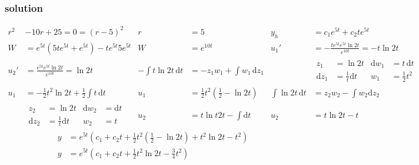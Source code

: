 \documentclass{article}
\begin{document}
\subsubsection*{solution}
\begin{align*}
	r^2&-10r+25=0=(r-5)^2 & r&=5 & y_h&=c_1e^{5t}+c_2te^{5t}\\
	W&=e^{5t}\left(5te^{5t}+e^{5t}\right)-te^{5t}5e^{5t} & W&=e^{10t} & {u_1}'&=-\frac{te^{5t}e^{5t}\ln 2t}{e^{10t}}=-t\ln 2t\\
	{u_2}'&=\frac{e^{5t}e^{5t}\ln 2t}{e^{10t}}=\ln 2t & -\int{t\ln 2t\,\mathrm{d}t}&=-z_1w_1+\int{w_1\,\mathrm{d}z_1} &&
	\begin{aligned}
		z_1&=\ln 2t & \mathrm{d}w_1&=t\,\mathrm{d}t\\
		\mathrm{d}z_1&=\frac{1}{t}\mathrm{d}t & w_1&=\frac{1}{2}t^2
	\end{aligned}\\
	u_1&=-\frac{1}{2}t^2\ln 2t+\frac{1}{2}\int{t\,\mathrm{d}t} & u_1&=\frac{1}{2}t^2\left(\frac{1}{2}-\ln 2t\right) & \int{\ln 2t\,\mathrm{d}t}&=z_2w_2-\int{w_2\mathrm{d}z_2}\\
	&\begin{aligned}
		z_2&=\ln 2t & \mathrm{d}w_2&=\mathrm{d}t\\
		\mathrm{d}z_2&=\frac{1}{t}\mathrm{d}t & w_2&=t
	\end{aligned} &
	u_2&=t\ln t 2t-\int{\mathrm{d}t} & u_2&=t\ln 2t-t
\end{align*}
\begin{align*}
	y&=e^{5t}\left(c_1+c_2t+\frac{1}{2}t^2\left(\frac{1}{2}-\ln 2t\right)+t^2\ln 2t-t^2\right)\\
	y&=e^{5t}\left(c_1+c_2t+\frac{1}{2}t^2\ln 2t-\frac{3}{4}t^2\right)
\end{align*}
\end{document}
